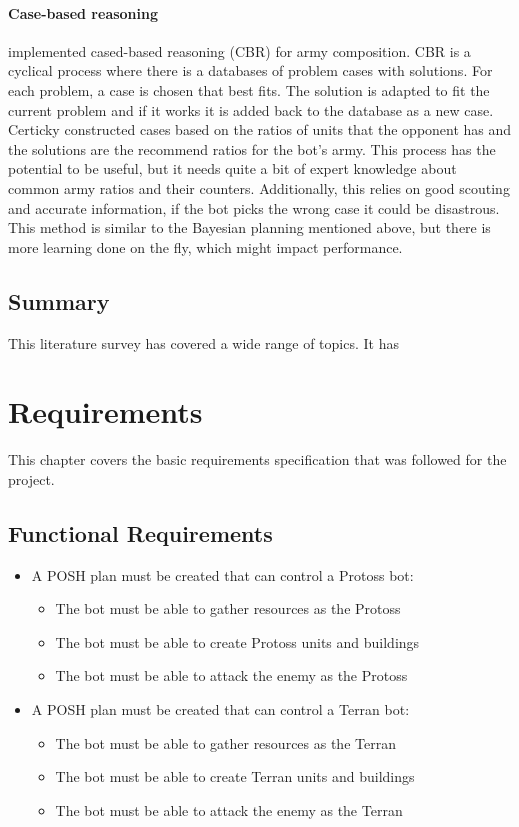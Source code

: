 \documentclass[11pt,openright,a4paper]{report}
\begin{document}
\subsubsection{Case-based reasoning}
 implemented cased-based reasoning (CBR) for army composition. CBR is a cyclical process where there is a databases of problem cases with solutions. For each problem, a case is chosen that best fits. The solution is adapted to fit the current problem and if it works it is added back to the database as a new case. Certicky constructed cases based on the ratios of units that the opponent has and the solutions are the recommend ratios for the bot's army. This process has the potential to be useful, but it needs quite a bit of expert knowledge about common army ratios and their counters. Additionally, this relies on good scouting and accurate information, if the bot picks the wrong case it could be disastrous. This method is similar to the Bayesian planning mentioned above, but there is more learning done on the fly, which might impact performance.

\section{Summary}
This literature survey has covered a wide range of topics. It has

\chapter{Requirements}
This chapter covers the basic requirements specification that was followed for the project.

\section{Functional Requirements}
\begin{itemize}
\item A POSH plan must be created that can control a Protoss bot:
    \begin{itemize}
    \item{The bot must be able to gather resources as the Protoss}
    \item{The bot must be able to create Protoss units and buildings}
    \item{The bot must be able to attack the enemy as the Protoss}
    \end{itemize}
\item A POSH plan must be created that can control a Terran bot:
    \begin{itemize}
    \item{The bot must be able to gather resources as the Terran}
    \item{The bot must be able to create Terran units and buildings}
    \item{The bot must be able to attack the enemy as the Terran}
    \end{itemize}
\end{itemize}
\end{document}
